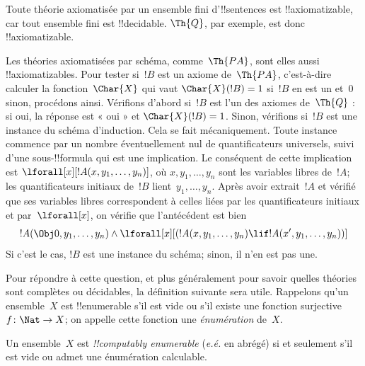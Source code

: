 \documentclass[../../../include/open-logic-section]{subfiles}
\begin{document}
\begin{ex}
Toute théorie axiomatisée par un ensemble fini d'!!{sentence}s est
!!{axiomatizable}, car tout ensemble fini est !!{decidable}.
$\Th{Q}$, par exemple, est donc !!{axiomatizable}.

Les théories axiomatisées par schéma, comme~$\Th{PA}$, sont elles
aussi !!{axiomatizable}s. Pour tester si~$!B$ est un axiome
de~$\Th{PA}$, c'est-à-dire calculer la fonction~$\Char{X}$ qui vaut
$\Char{X}(!B)=1$ si~$!B$ en est un et~$0$ sinon, procédons ainsi.
Vérifions d'abord si~$!B$ est l'un des axiomes de~$\Th{Q}$ : si oui,
la réponse est « oui » et $\Char{X}(!B)=1$. Sinon, vérifions si~$!B$
est une instance du schéma d'induction. Cela se fait mécaniquement.
Toute instance commence par un nombre éventuellement nul de
quantificateurs universels, suivi d'une sous-!!{formula} qui est une
implication. Le conséquent de cette implication est
$\lforall[x][!A(x,y_1,\dots,y_n)]$, où $x,y_1,\dots,y_n$ sont les
variables libres de~$!A$; les quantificateurs initiaux de~$!B$
lient~$y_1,\dots,y_n$. Après avoir extrait~$!A$ et vérifié que ses
variables libres correspondent à celles liées par les quantificateurs
initiaux et par~$\lforall[x]$, on vérifie que l'antécédent est bien
\[
!A(\Obj 0, y_1, \dots, y_n) \land \lforall[x][(!A(x, y_1, \dots, y_n)
\lif !A(x', y_1, \dots, y_n))]
\]
Si c'est le cas, $!B$ est une instance du schéma; sinon,
il n'en est pas une.
\end{ex}

Pour répondre à cette question, et plus généralement pour savoir
quelles théories sont complètes ou décidables, la définition suivante
sera utile. Rappelons qu'un ensemble~$X$ est !!{enumerable} s'il est
vide ou s'il existe une fonction surjective~$f\colon\Nat\to X$;
on appelle cette fonction une \emph{énumération} de~$X$.

\begin{defn}
Un ensemble~$X$ est \emph{!!{computably enumerable}}
(\emph{e.é.} en abrégé) si et seulement s'il est vide ou admet une
énumération calculable.
\end{defn}
\end{document}
